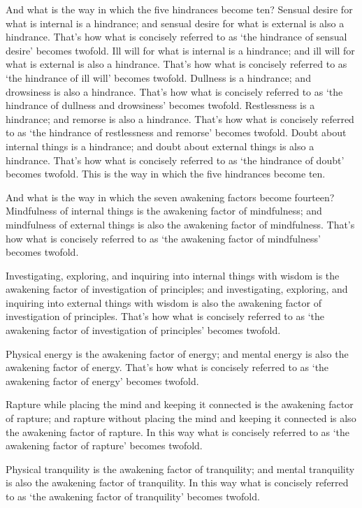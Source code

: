 \documentclass[12pt,openany]{book}%
\begin{document}
And what is the way in which the five hindrances become ten? Sensual desire for what is internal is a hindrance; and sensual desire for what is external is also a hindrance. That’s how what is concisely referred to as ‘the hindrance of sensual desire’ becomes twofold. Ill will for what is internal is a hindrance; and ill will for what is external is also a hindrance. That’s how what is concisely referred to as ‘the hindrance of ill will’ becomes twofold. Dullness is a hindrance; and drowsiness is also a hindrance. That’s how what is concisely referred to as ‘the hindrance of dullness and drowsiness’ becomes twofold. Restlessness is a hindrance; and remorse is also a hindrance. That’s how what is concisely referred to as ‘the hindrance of restlessness and remorse’ becomes twofold. Doubt about internal things is a hindrance; and doubt about external things is also a hindrance. That’s how what is concisely referred to as ‘the hindrance of doubt’ becomes twofold. This is the way in which the five hindrances become ten. 

And what is the way in which the seven awakening factors become fourteen? Mindfulness of internal things is the awakening factor of mindfulness; and mindfulness of external things is also the awakening factor of mindfulness. That’s how what is concisely referred to as ‘the awakening factor of mindfulness’ becomes twofold. 

Investigating, exploring, and inquiring into internal things with wisdom is the awakening factor of investigation of principles; and investigating, exploring, and inquiring into external things with wisdom is also the awakening factor of investigation of principles. That’s how what is concisely referred to as ‘the awakening factor of investigation of principles’ becomes twofold. 

Physical energy is the awakening factor of energy; and mental energy is also the awakening factor of energy. That’s how what is concisely referred to as ‘the awakening factor of energy’ becomes twofold. 

Rapture while placing the mind and keeping it connected is the awakening factor of rapture; and rapture without placing the mind and keeping it connected is also the awakening factor of rapture. In this way what is concisely referred to as ‘the awakening factor of rapture’ becomes twofold. 

Physical tranquility is the awakening factor of tranquility; and mental tranquility is also the awakening factor of tranquility. In this way what is concisely referred to as ‘the awakening factor of tranquility’ becomes twofold. 
\end{document}
